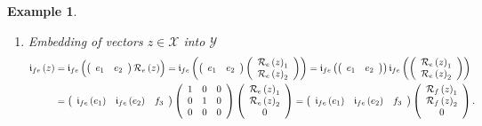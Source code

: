 \documentclass[aps,preprint]{revtex4}%
\newtheorem{example}[theorem]{Example}
\begin{document}
\begin{example}
\begin{enumerate}
\begin{enumerate}
\item Embedding of vectors $z\in\mathcal{X}$ into $\mathcal{Y}$
\begin{align}
\mathfrak{i}_{fe}\left(  z\right)   &  =\mathfrak{i}_{fe}\left(
\overset{}{\left(
\begin{array}
[c]{cc}%
e_{1} & e_{2}%
\end{array}
\right)  \mathcal{R}_{e}\left(  z\right)  }\right)  =\mathfrak{i}_{fe}\left(
\left(
\begin{array}
[c]{cc}%
e_{1} & e_{2}%
\end{array}
\right)  \left(
\begin{array}
[c]{c}%
\mathcal{R}_{e}\left(  z\right)  _{1}\\
\mathcal{R}_{e}\left(  z\right)  _{2}%
\end{array}
\right)  \right)  =\mathfrak{i}_{fe}\left(  \left(
\begin{array}
[c]{cc}%
e_{1} & e_{2}%
\end{array}
\right)  \right)  \mathfrak{i}_{fe}\left(  \left(
\begin{array}
[c]{c}%
\mathcal{R}_{e}\left(  z\right)  _{1}\\
\mathcal{R}_{e}\left(  z\right)  _{2}%
\end{array}
\right)  \right) \\
&  =\left(
\begin{array}
[c]{ccc}%
\mathfrak{i}_{fe}\left(  e_{1}\right)  & \mathfrak{i}_{fe}\left(  e_{2}\right)
& f_{3}%
\end{array}
\right)  \left(
\begin{array}
[c]{ccc}%
1 & 0 & 0\\
0 & 1 & 0\\
0 & 0 & 0
\end{array}
\right)  \left(
\begin{array}
[c]{c}%
\mathcal{R}_{e}\left(  z\right)  _{1}\\
\mathcal{R}_{e}\left(  z\right)  _{2}\\
0
\end{array}
\right)  =\left(
\begin{array}
[c]{ccc}%
\mathfrak{i}_{fe}\left(  e_{1}\right)  & \mathfrak{i}_{fe}\left(  e_{2}\right)
& f_{3}%
\end{array}
\right)  \left(
\begin{array}
[c]{c}%
\mathcal{R}_{f}\left(  z\right)  _{1}\\
\mathcal{R}_{f}\left(  z\right)  _{2}\\
0
\end{array}
\right)  .
\end{align}



\end{enumerate}
\end{enumerate}
\end{example}
\end{document}
